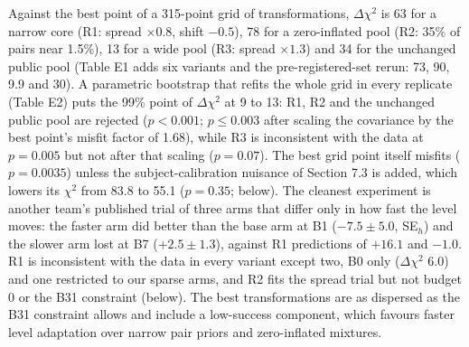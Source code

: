 \documentclass[
]{article}
\begin{document}
Against the best point of a 315-point grid of transformations,
\(\Delta\chi^2\) is 63 for a narrow core (R1: spread \(\times 0.8\),
shift \(-0.5\)), 78 for a zero-inflated pool (R2: 35\% of pairs near
1.5\%), 13 for a wide pool (R3: spread \(\times 1.3\)) and 34 for the
unchanged public pool (Table E1 adds six variants and the
pre-registered-set rerun: 73, 90, 9.9 and 30). A parametric bootstrap
that refits the whole grid in every replicate (Table E2) puts the 99\%
point of \(\Delta\chi^2\) at 9 to 13: R1, R2 and the unchanged public
pool are rejected (\(p < 0.001\); \(p \le 0.003\) after scaling the
covariance by the best point's misfit factor of 1.68), while R3 is
inconsistent with the data at \(p = 0.005\) but not after that scaling
(\(p = 0.07\)). The best grid point itself misfits (\(p = 0.0035\))
unless the subject-calibration nuisance of Section 7.3 is added, which
lowers its \(\chi^2\) from 83.8 to 55.1 (\(p = 0.35\); below). The
cleanest experiment is another team's published trial of three arms that
differ only in how fast the level moves: the faster arm did better than
the base arm at B1 (\(-7.5 \pm 5.0\), SE\(_h\)) and the slower arm lost
at B7 (\(+2.5 \pm 1.3\)), against R1 predictions of \(+16.1\) and
\(-1.0\). R1 is inconsistent with the data in every variant except two,
B0 only (\(\Delta\chi^2\) 6.0) and one restricted to our sparse arms,
and R2 fits the spread trial but not budget 0 or the B31 constraint
(below). The best transformations are as dispersed as the B31 constraint
allows and include a low-success component, which favours faster level
adaptation over narrow pair priors and zero-inflated mixtures.
\end{document}
